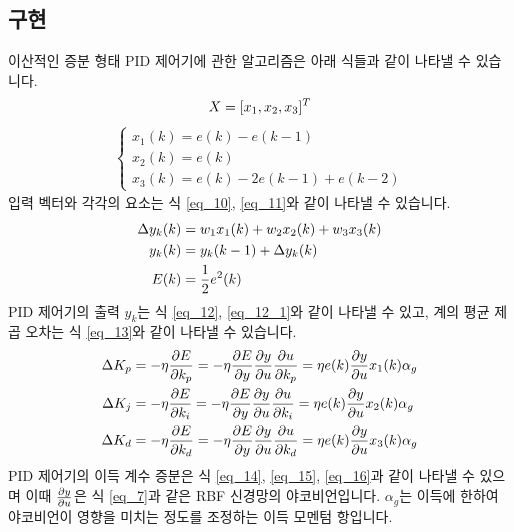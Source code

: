 \subsection{구현}
이산적인 증분 형태 PID 제어기에 관한 알고리즘은 아래 식들과 같이 나타낼 수 있습니다. \cite{6409235}
\begin{equation}
\label{eq_10}
X =[x_{1},x_{2},x_{3}]^{T} \\
\end{equation}
\begin{gather}
\label{eq_11}
\begin{cases}
x_{1}(k)=e(k)-e(k-1) \\ x_{2}(k)=e(k) \\ x_{3}(k)=e(k)-2e(k-1)+e(k-2) 
\end{cases} 
\end{gather}
%
입력 벡터와 각각의 요소는 식 \ref{eq_10}, \ref{eq_11}와 같이 나타낼 수 있습니다.
%
\begin{align}
\label{eq_12}
\Delta y_{k}(k) &=w_{1}x_{1}(k)+w_{2}x_{2}(k)+w_{3}x_{3}(k) \\
\label{eq_12_1}
y_{k}(k) &= y_{k}(k-1) + \Delta y_{k}(k) \\
\label{eq_13}
E(k) &={1\over 2}e^{2}(k)
\end{align}
%
PID 제어기의 출력 \(y_{k}\)는 식 \ref{eq_12}, \ref{eq_12_1}와 같이 나타낼 수 있고, 계의 평균 제곱 오차는 식 \ref{eq_13}와 같이 나타낼 수 있습니다.
%
\begin{align}
\label{eq_14}
\Delta K_{p} &=-\eta{\partial E\over \partial k_{p}}=-\eta{\partial E\over \partial y}{\partial y\over \partial u}{\partial u\over \partial k_{p}}=\eta e(k){\partial y\over \partial u}x_{1}(k)\alpha_{g} \\
\label{eq_15}
\Delta K_{j} &=-\eta{\partial E\over \partial k_{i}}=-\eta{\partial E\over \partial y}{\partial y\over \partial u}{\partial u\over \partial k_{i}}=\eta e(k){\partial y\over \partial u}x_{2}(k)\alpha_{g} \\
\label{eq_16}
\Delta K_{d} &=-\eta{\partial E\over \partial k_{d}}=-\eta{\partial E\over \partial y}{\partial y\over \partial u}{\partial u\over \partial k_{d}}=\eta e(k){\partial y\over \partial u}x_{3}(k)\alpha_{g}
\end{align}
PID 제어기의 이득 계수 증분은 식 \ref{eq_14}, \ref{eq_15}, \ref{eq_16}과 같이 나타낼 수 있으며 이때 \({\partial y\over \partial u}\)은 식 \ref{eq_7}과 같은 RBF 신경망의 야코비언입니다. \(\alpha_{g}\)는 이득에 한하여 야코비언이 영향을 미치는 정도를 조정하는 이득 모멘텀 항입니다.

